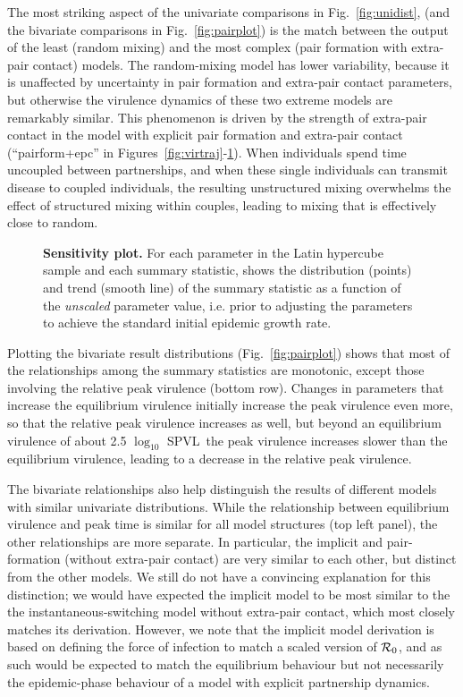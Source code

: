 \documentclass[10pt,letterpaper]{article}
\newcommand{\Lspvl}{$\log_{10}$ SPVL}
\begin{document}
The most striking aspect of the univariate comparisons in
Fig.~\ref{fig:unidist}, (and the bivariate comparisons in
Fig.~\ref{fig:pairplot}) is the match between the output of the
least (random mixing) and the most complex (pair formation with
extra-pair contact) models. The random-mixing model has lower
variability, because it is unaffected by uncertainty in pair formation
and extra-pair contact parameters, but otherwise the virulence
dynamics of these two extreme models are remarkably similar.
This phenomenon is driven by the strength of extra-pair contact in the
model with explicit pair formation and extra-pair contact 
(``pairform+epc'' in Figures~\ref{fig:virtraj}-\ref{fig:plot_sens}). When individuals spend time uncoupled between
partnerships, and when these single individuals can transmit disease
to coupled individuals, the resulting unstructured mixing overwhelms
the effect of structured mixing within couples, leading to mixing
that is effectively close to random.

\begin{figure}[!h]
\caption{{\bf Sensitivity plot.}
For each parameter in the Latin hypercube sample and each summary statistic, shows the distribution (points) and trend (smooth line) of the summary statistic as a function of the \emph{unscaled} parameter value, i.e. prior to adjusting the parameters to achieve the standard initial epidemic growth rate.}
\label{fig:plot_sens}
\end{figure}

Plotting the bivariate result distributions (Fig.~\ref{fig:pairplot})
shows that most of the relationships among the summary statistics
are monotonic, except those involving the relative peak virulence
(bottom row). Changes in parameters that increase the equilibrium
virulence initially increase the peak virulence even more, so
that the relative peak virulence increases as well, but beyond
an equilibrium virulence of about 2.5 \Lspvl\ the peak virulence
increases slower than the equilibrium virulence, leading to a
decrease in the relative peak virulence.

The bivariate relationships also help distinguish the results of 
different models with similar univariate distributions. While the
relationship between equilibrium virulence and peak time is
similar for all model structures (top left panel), the other
relationships are more separate. In particular, the implicit
and pair-formation (without extra-pair contact) are very similar
to each other, but distinct from the other models. We still do
not have a convincing explanation for this distinction; we
would have expected the implicit model to be most similar to the
the instantaneous-switching model without extra-pair contact,
which most closely matches its derivation. However, we note
that the implicit model derivation is based on defining
the force of infection to match a scaled version of ${\cal R}_0$,
and as such would be expected to match the equilibrium behaviour
but not necessarily the epidemic-phase behaviour of a model
with explicit partnership dynamics.
\end{document}
